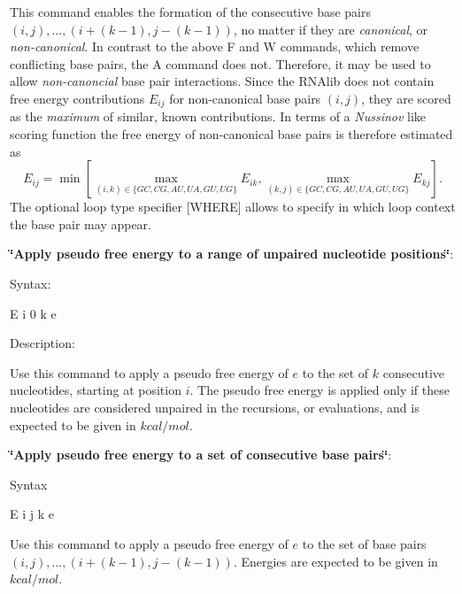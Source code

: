 \begin{DoxyEnumerate}
 This command enables the formation of the consecutive base pairs $ (i,j), \ldots, (i+(k-1), j-(k-1)) $, no matter if they are {\itshape canonical}, or {\itshape non-\/canonical}. In contrast to the above {\ttfamily F} and {\ttfamily W} commands, which remove conflicting base pairs, the {\ttfamily A} command does not. Therefore, it may be used to allow {\itshape non-\/canoncial} base pair interactions. Since the R\-N\-Alib does not contain free energy contributions $ E_{ij} $ for non-\/canonical base pairs $ (i,j) $, they are scored as the {\itshape maximum} of similar, known contributions. In terms of a {\itshape Nussinov} like scoring function the free energy of non-\/canonical base pairs is therefore estimated as \[ E_{ij} = \min \left[ \max_{(i,k) \in \{GC, CG, AU, UA, GU, UG\}} E_{ik}, \max_{(k,j) \in \{GC, CG, AU, UA, GU, UG\}} E_{kj} \right]. \] The optional loop type specifier {\ttfamily }\mbox{[}W\-H\-E\-R\-E\mbox{]} allows to specify in which loop context the base pair may appear.
\item {\bfseries \char`\"{}\-Apply pseudo free energy to a range of unpaired nucleotide positions\char`\"{}}\-:\par
 Syntax\-:
\begin{DoxyCode}
E i 0 k e 
\end{DoxyCode}
\par
 Description\-:\par
 Use this command to apply a pseudo free energy of $ e $ to the set of $ k $ consecutive nucleotides, starting at position $ i $. The pseudo free energy is applied only if these nucleotides are considered unpaired in the recursions, or evaluations, and is expected to be given in $ kcal / mol $.
\item {\bfseries \char`\"{}\-Apply pseudo free energy to a set of consecutive base pairs\char`\"{}}\-:\par
 Syntax
\begin{DoxyCode}
E i j k e 
\end{DoxyCode}
\par
 Use this command to apply a pseudo free energy of $ e $ to the set of base pairs $ (i,j), \ldots, (i+(k-1), j-(k-1)) $. Energies are expected to be given in $ kcal / mol $. 
\end{DoxyEnumerate}